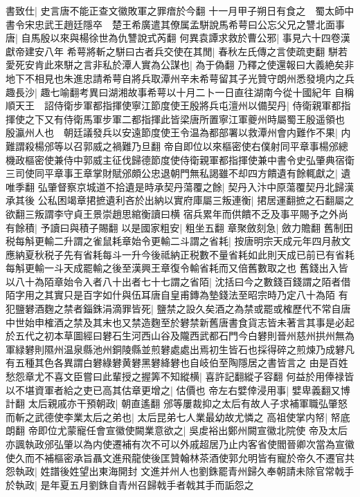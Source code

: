 書致仕|{
	史言唐不能正查文徽敗軍之罪瘖於今翻}
十一月甲子朔日有食之　蜀太師中書令宋忠武王趙廷隱卒　楚王希廣遣其僚属孟駢說馬希萼曰公忘父兄之讐北面事唐|{
	自馬殷以來與楊徐世為仇讐說式芮翻}
何異袁譚求救於曹公邪|{
	事見六十四卷漢獻帝建安八年}
希萼將斬之駢曰古者兵交使在其閒|{
	春秋左氏傳之言使疏吏翻}
駢若愛死安肯此來駢之言非私於潭人實為公謀也|{
	為于偽翻}
乃釋之使還報曰大義絶矣非地下不相見也朱進忠請希萼自將兵取潭州辛未希萼留其子光贊守朗州悉發境内之兵趣長沙|{
	趣七喻翻考異曰湖湘故事希萼以十月二卜一日直往湖南今從十國紀年}
自稱順天王　詔侍衛步軍都指揮使寧江節度使王殷將兵屯澶州以備契丹|{
	侍衛親軍都指揮使之下又有侍衛馬軍步軍二都指揮此皆梁唐所置寧江軍夔州時屬蜀王殷遥領也}
殷瀛州人也　朝廷議發兵以安遠節度使王令温為都部署以救潭州會内難作不果|{
	内難謂殺楊邠等以召郭威之禍難乃旦翻}
帝自即位以來樞密使右僕射同平章事楊邠總機政樞密使兼侍中郭威主征伐歸德節度使侍衛親軍都指揮使兼中書令史弘肇典宿衛三司使同平章事王章掌財賦邠頗公忠退朝門無私謁雖不却四方饋遺有餘輒獻之|{
	遺唯季翻}
弘肇督察京城道不拾遺是時承契丹蕩覆之餘|{
	契丹入汴中原蕩覆契丹北歸漢承其後}
公私困竭章捃摭遺利吝於出納以實府庫屬三叛連衡|{
	捃居運翻摭之石翻屬之欲翻三叛謂李守貞王景崇趙思綰衡讀曰横}
宿兵累年而供饋不乏及事平賜予之外尚有餘積|{
	予讀曰與積子賜翻}
以是國家粗安|{
	粗坐五翻}
章聚斂刻急|{
	斂力贍翻}
舊制田税每斛更輸二升謂之雀鼠耗章始令更輸二斗謂之省耗|{
	按唐明宗天成元年四月赦文應納夏秋税子先有省耗每斗一升今後祗納正税數不量省耗如此則天成已前已有省耗每斛更輸一斗天成罷輸之後至漢興王章復令輸省耗而又倍舊數取之也}
舊錢出入皆以八十為陌章始令入者八十出者七十七謂之省陌|{
	沈括曰今之數錢百錢謂之陌者借陌字用之其實只是百字如什與伍耳唐自皇甫鏄為墊錢法至昭宗時乃定八十為陌}
有犯鹽礬酒麴之禁者錙銖涓滴罪皆死|{
	鹽禁之設久矣酒之為禁或罷或榷歷代不常自唐中世始申榷酒之禁及其末也又禁造麴至於礬禁新舊唐書食貨志皆未著言其事是必起於五代之初本草圖經曰礬石生河西山谷及隴西武都石門今白礬則晉州慈州拱州無為軍緑礬則隰州温泉縣池州銅陵縣並煎礬處處出焉初生皆石也採得碎之煎煉乃成礬凡有五種其色各異謂白礬綠礬黄礬黑礬絳礬也自岐伯至陶隱居之書皆言之}
由是百姓愁怨章尤不喜文臣嘗曰此輩授之握筭不知縱横|{
	喜許記翻縱子容翻}
何益於用俸禄皆以不堪資軍者給之吏已高其估章更增之|{
	估價也}
帝左右嬖倖浸用事|{
	嬖卑義翻又博計翻}
太后親戚亦干預朝政|{
	朝直遙翻}
邠等屢裁抑之太后有故人子求補軍職弘肇怒而斬之武德使李業太后之弟也|{
	太后昆弟七人業最幼故尤憐之}
高祖使掌内帑|{
	帑底朗翻}
帝即位尤蒙寵任會宣徽使闕業意欲之|{
	吳䖍裕出鄭州闕宣徽北院使}
帝及太后亦諷執政邠弘肇以為内使遷補有次不可以外戚超居乃止内客省使閻晉卿次當為宣徽使久而不補樞密承旨聶文進飛龍使後匡贊翰林茶酒使郭允明皆有寵於帝久不遷官共怨執政|{
	姓譜後姓望出東海開封}
文進并州人也劉銖罷青州歸久奉朝請未除官常戟手於執政|{
	是年夏五月劉銖自青州召歸戟手者戟其手而詬怨之}
